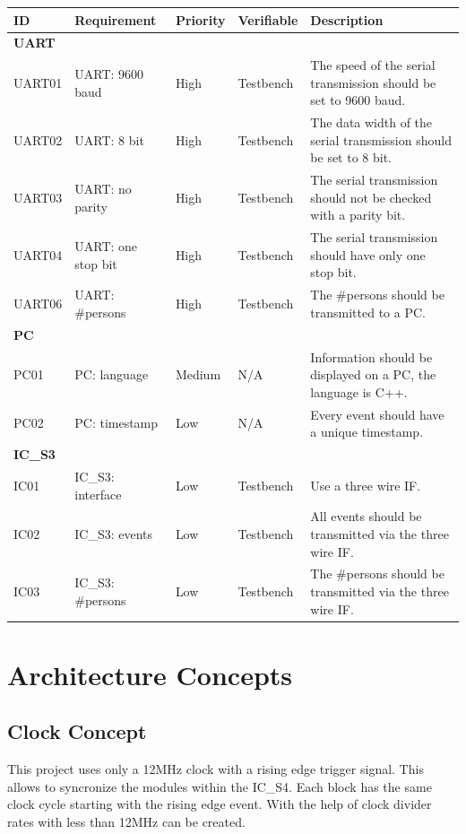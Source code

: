 \documentclass[12pt,a4 paper] {report}
\begin{document}
\begin{center}
	\begin{tabular}{|p{1.5cm}|p{3.5cm}|p{1.5cm}|p{2cm}|p{5.5cm}|}
		\hline
		\textbf{ID} & \textbf{Requirement} & \textbf{Priority} & \textbf{Verifiable} & \textbf{Description} \\
		\hline
		\multicolumn{5}{|l|}{\textbf{UART}} \\
		\hline
		UART01 & UART: 9600 baud & High &  Testbench & The speed of the serial transmission should be set to 9600 baud. \\
		\hline
		UART02 & UART: 8 bit & High & Testbench & The data width of the serial transmission should be set to 8 bit. \\
		\hline
		UART03 & UART: no parity & High & Testbench & The serial transmission should not be checked with a parity bit. \\
		\hline
		UART04 & UART: one stop bit & High  & Testbench & The serial transmission should have only one stop bit. \\
		\hline
		UART06 & UART: \#persons & High &  Testbench &  The \#persons should be transmitted to a PC. \\
		\hline
		\multicolumn{5}{|l|}{\textbf{PC}} \\
		\hline	
		PC01 & PC: language & Medium & N/A &  Information should be displayed on a PC, the language is C++. \\
		\hline
		PC02 & PC: timestamp & Low & N/A  & Every event should have a unique timestamp. \\
		\hline
		\multicolumn{5}{|l|}{\textbf{IC\_S3}} \\
		\hline
		IC01 & IC\_S3: interface & Low & Testbench & Use a three wire IF. \\
		\hline
		IC02 & IC\_S3: events & Low & Testbench & All events should be transmitted via the three wire IF. \\
		\hline
		IC03 & IC\_S3: \#persons & Low  & Testbench & The \#persons should be transmitted via the three wire IF. \\
		\hline
	\end{tabular}
\end{center}

\newpage

\chapter{Architecture Concepts}
\section*{Clock Concept}
This project uses only a 12MHz clock with a rising edge trigger signal. This allows to syncronize the modules within the IC\_S4.
Each block has the same clock cycle starting with the rising edge event. With the help of clock divider rates with less than 12MHz can be created.
\end{document}
